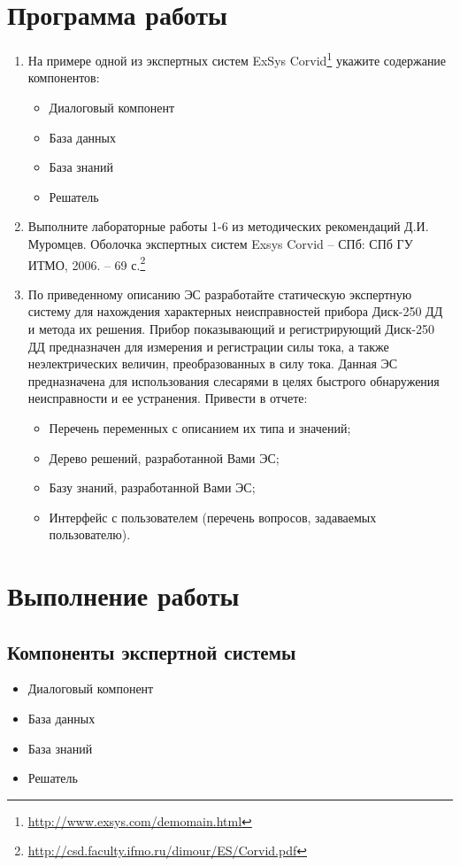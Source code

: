 





\tableofcontents
\newpage

\section{Программа работы}

\begin{enumerate}
	\item На примере одной из экспертных систем ExSys Corvid\footnote{\url{http://www.exsys.com/demomain.html}} укажите содержание компонентов:
	\begin{itemize}
		\item Диалоговый компонент
		\item База данных
		\item База знаний
		\item Решатель
	\end{itemize}
	\item Выполните лабораторные работы 1-6 из методических рекомендаций Д.И. Муромцев. Оболочка экспертных систем Exsys Corvid – СПб: СПб ГУ ИТМО, 2006. – 69 с.\footnote{\url{http://csd.faculty.ifmo.ru/dimour/ES/Corvid.pdf}}
	\item По приведенному описанию ЭС разработайте статическую экспертную систему для нахождения характерных неисправностей прибора Диск-250 ДД и метода их решения. Прибор показывающий и регистрирующий Диск-250 ДД предназначен для измерения и регистрации силы тока, а также неэлектрических величин, преобразованных в силу тока. Данная ЭС предназначена для использования слесарями в целях быстрого обнаружения неисправности и ее устранения. Привести в отчете:
	\begin{itemize}
		\item Перечень переменных с описанием их типа и значений;
		\item Дерево решений, разработанной Вами ЭС;
		\item Базу знаний, разработанной Вами ЭС;
		\item Интерфейс с пользователем (перечень вопросов, задаваемых пользователю).
	\end{itemize}
\end{enumerate}

\newpage

\section{Выполнение работы}

\subsection{Компоненты экспертной системы}

\begin{itemize}
	\item Диалоговый компонент
	\item База данных
	\item База знаний
	\item Решатель
\end{itemize}

\newpage





